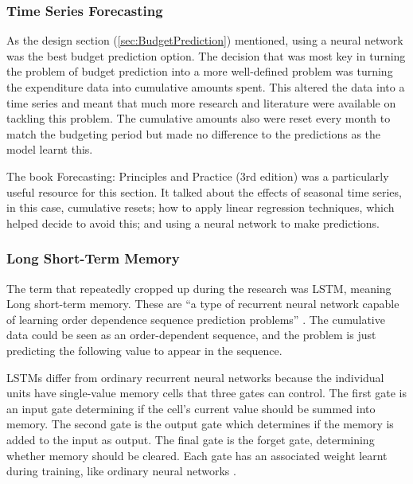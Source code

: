 \subsubsection{Time Series Forecasting}
As the design section (\ref{sec:BudgetPrediction}) mentioned, using a neural network was the best budget prediction option. The decision that was most key in turning the problem of budget prediction into a more well-defined problem was turning the expenditure data into cumulative amounts spent. This altered the data into a time series and meant that much more research and literature were available on tackling this problem. The cumulative amounts also were reset every month to match the budgeting period but made no difference to the predictions as the model learnt this.

The book Forecasting: Principles and Practice (3rd edition) \cite{ForecastingPrinciplesPractice} was a particularly useful resource for this section. It talked about the effects of seasonal time series, in this case, cumulative resets; how to apply linear regression techniques, which helped decide to avoid this; and using a neural network to make predictions.

\subsubsection{Long Short-Term Memory}
The term that repeatedly cropped up during the research was LSTM, meaning Long short-term memory. These are ``a type of recurrent neural network capable of learning order dependence sequence prediction problems'' \cite{LSTMGentleIntro}. The cumulative data could be seen as an order-dependent sequence, and the problem is just predicting the following value to appear in the sequence.

LSTMs differ from ordinary recurrent neural networks because the individual units have single-value memory cells that three gates can control. The first gate is an input gate determining if the cell's current value should be summed into memory. The second gate is the output gate which determines if the memory is added to the input as output. The final gate is the forget gate, determining whether memory should be cleared. Each gate has an associated weight learnt during training, like ordinary neural networks \cite{LSTMBig}.

